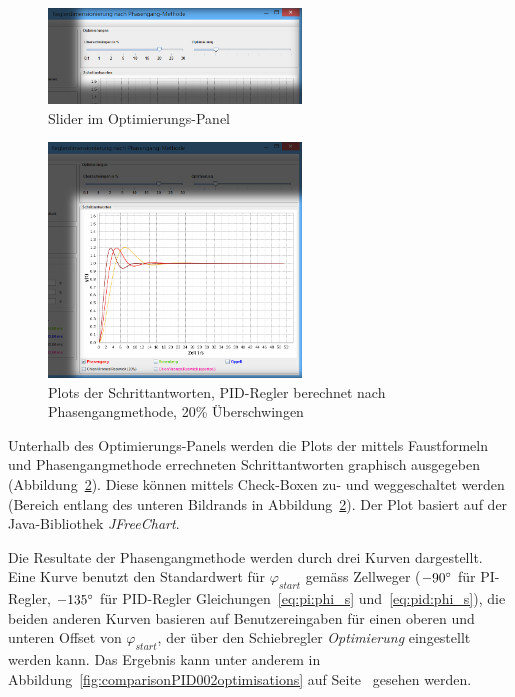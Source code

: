 \begin{figure}[h!, width=\pagewidth]
    \centering
    \includegraphics[width=0.6\textwidth]{images/tool20UeberschwingenPIDOptimierungen.jpg}
    \caption{Slider im Optimierungs-Panel}
    \label{fig:optimierungen}
\end{figure}

\begin{figure}[h!, width=\pagewidth]
    \centering
    \includegraphics[width=0.6\textwidth]{images/tool20UeberschwingenPIDPlots.jpg}
    \caption{Plots der Schrittantworten, PID-Regler berechnet nach Phasengangmethode, 20\% \"Uberschwingen}
    \label{fig:tool20Plots}
\end{figure}

Unterhalb des  Optimierungs-Panels werden  die Plots der  mittels Faustformeln
und  Phasengangmethode   errechneten  Schrittantworten   graphisch  ausgegeben
(Abbildung~\ref{fig:tool20Plots}). Diese  k\"onnen   mittels  Check-Boxen  zu-
und   weggeschaltet  werden   (Bereich  entlang   des  unteren   Bildrands  in
Abbildung~\ref{fig:tool20Plots}). Der  Plot  basiert auf  der  Java-Bibliothek
\emph{JFreeChart}.

Die    Resultate   der    Phasengangmethode   werden    durch   drei    Kurven
dargestellt. Eine  Kurve  benutzt  den  Standardwert  f\"ur  $\varphi_{start}$
gem\"ass   Zellweger  ($-90\degree$   f\"ur  PI-Regler,   $-135\degree$  f\"ur
PID-Regler    Gleichungen~\ref{eq:pi:phi_s}    und~\ref{eq:pid:phi_s}),    die
beiden   anderen   Kurven   basieren    auf   Benutzereingaben   f\"ur   einen
oberen   und   unteren   Offset   von  $\varphi_{start}$,   der   \"uber   den
Schiebregler  \emph{Optimierung} eingestellt  werden  kann. Das Ergebnis  kann
unter   anderem   in   Abbildung~\ref{fig:comparisonPID002optimisations}   auf
Seite~\pageref{fig:comparisonPI015} gesehen werden.

